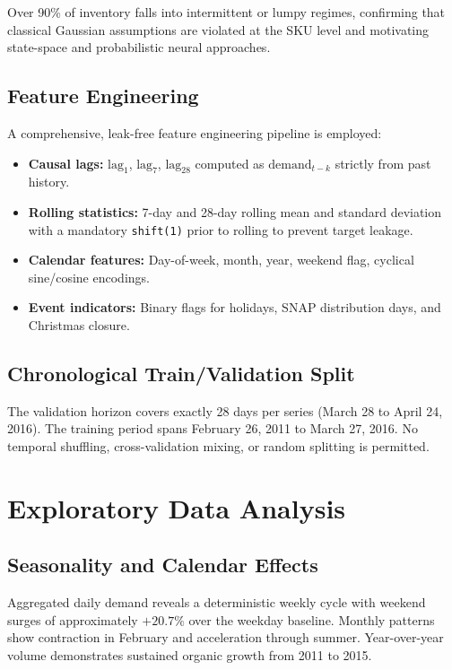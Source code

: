 \documentclass[conference]{IEEEtran}
\begin{document}
Over 90\% of inventory falls into intermittent or lumpy regimes, confirming that classical Gaussian assumptions are violated at the SKU level and motivating state-space and probabilistic neural approaches.

\subsection{Feature Engineering}

A comprehensive, leak-free feature engineering pipeline is employed:
\begin{itemize}
    \item \textbf{Causal lags:} $\text{lag}_1$, $\text{lag}_7$, $\text{lag}_{28}$ computed as $\text{demand}_{t-k}$ strictly from past history.
    \item \textbf{Rolling statistics:} 7-day and 28-day rolling mean and standard deviation with a mandatory \texttt{shift(1)} prior to rolling to prevent target leakage.
    \item \textbf{Calendar features:} Day-of-week, month, year, weekend flag, cyclical sine/cosine encodings.
    \item \textbf{Event indicators:} Binary flags for holidays, SNAP distribution days, and Christmas closure.
\end{itemize}

\subsection{Chronological Train/Validation Split}

The validation horizon covers exactly 28 days per series (March 28 to April 24, 2016). The training period spans February 26, 2011 to March 27, 2016. No temporal shuffling, cross-validation mixing, or random splitting is permitted.

\section{Exploratory Data Analysis}

\subsection{Seasonality and Calendar Effects}

Aggregated daily demand reveals a deterministic weekly cycle with weekend surges of approximately $+20.7\%$ over the weekday baseline. Monthly patterns show contraction in February and acceleration through summer. Year-over-year volume demonstrates sustained organic growth from 2011 to 2015.
\end{document}

